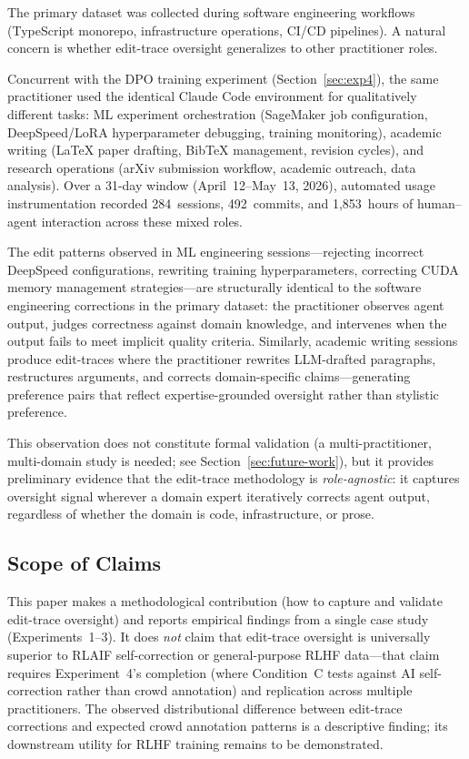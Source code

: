 \documentclass[11pt]{article}
\begin{document}
The primary dataset was collected during software engineering workflows (TypeScript monorepo, infrastructure operations, CI/CD pipelines).
A natural concern is whether edit-trace oversight generalizes to other practitioner roles.

Concurrent with the DPO training experiment (Section~\ref{sec:exp4}), the same practitioner used the identical Claude Code environment for qualitatively different tasks: ML experiment orchestration (SageMaker job configuration, DeepSpeed/LoRA hyperparameter debugging, training monitoring), academic writing (LaTeX paper drafting, BibTeX management, revision cycles), and research operations (arXiv submission workflow, academic outreach, data analysis).
Over a 31-day window (April~12--May~13, 2026), automated usage instrumentation recorded 284~sessions, 492~commits, and 1{,}853~hours of human--agent interaction across these mixed roles.

The edit patterns observed in ML engineering sessions---rejecting incorrect DeepSpeed configurations, rewriting training hyperparameters, correcting CUDA memory management strategies---are structurally identical to the software engineering corrections in the primary dataset: the practitioner observes agent output, judges correctness against domain knowledge, and intervenes when the output fails to meet implicit quality criteria.
Similarly, academic writing sessions produce edit-traces where the practitioner rewrites LLM-drafted paragraphs, restructures arguments, and corrects domain-specific claims---generating preference pairs that reflect expertise-grounded oversight rather than stylistic preference.

This observation does not constitute formal validation (a multi-practitioner, multi-domain study is needed; see Section~\ref{sec:future-work}), but it provides preliminary evidence that the edit-trace methodology is \emph{role-agnostic}: it captures oversight signal wherever a domain expert iteratively corrects agent output, regardless of whether the domain is code, infrastructure, or prose.

\subsection{Scope of Claims}

This paper makes a methodological contribution (how to capture and validate edit-trace oversight) and reports empirical findings from a single case study (Experiments~1--3).
It does \emph{not} claim that edit-trace oversight is universally superior to RLAIF self-correction or general-purpose RLHF data---that claim requires Experiment~4's completion (where Condition~C tests against AI self-correction rather than crowd annotation) and replication across multiple practitioners.
The observed distributional difference between edit-trace corrections and expected crowd annotation patterns is a descriptive finding; its downstream utility for RLHF training remains to be demonstrated.
\end{document}
